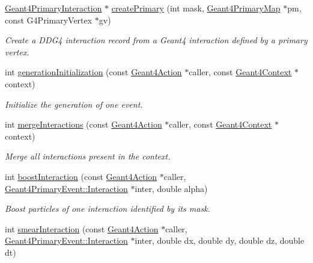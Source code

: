 \begin{DoxyCompactItemize}
\hyperlink{class_d_d4hep_1_1_simulation_1_1_geant4_primary_interaction}{Geant4\+Primary\+Interaction} $\ast$ \hyperlink{namespace_d_d4hep_1_1_simulation_a36acd8dbd545f60bf3b6c7f06209898e}{create\+Primary} (int mask, \hyperlink{class_d_d4hep_1_1_simulation_1_1_geant4_primary_map}{Geant4\+Primary\+Map} $\ast$pm, const G4\+Primary\+Vertex $\ast$gv)
\begin{DoxyCompactList}\small\item\em Create a D\+D\+G4 interaction record from a Geant4 interaction defined by a primary vertex. \end{DoxyCompactList}\item 
int \hyperlink{namespace_d_d4hep_1_1_simulation_aaf70bd3ee9651c20efdf16a10dfa8dc8}{generation\+Initialization} (const \hyperlink{class_d_d4hep_1_1_simulation_1_1_geant4_action}{Geant4\+Action} $\ast$caller, const \hyperlink{class_d_d4hep_1_1_simulation_1_1_geant4_context}{Geant4\+Context} $\ast$context)
\begin{DoxyCompactList}\small\item\em Initialize the generation of one event. \end{DoxyCompactList}\item 
int \hyperlink{namespace_d_d4hep_1_1_simulation_a443dcc90d4d35ae2cab73956bbd2a2d8}{merge\+Interactions} (const \hyperlink{class_d_d4hep_1_1_simulation_1_1_geant4_action}{Geant4\+Action} $\ast$caller, const \hyperlink{class_d_d4hep_1_1_simulation_1_1_geant4_context}{Geant4\+Context} $\ast$context)
\begin{DoxyCompactList}\small\item\em Merge all interactions present in the context. \end{DoxyCompactList}\item 
int \hyperlink{namespace_d_d4hep_1_1_simulation_a5af9f919753af128d90ae3bc13dc1c34}{boost\+Interaction} (const \hyperlink{class_d_d4hep_1_1_simulation_1_1_geant4_action}{Geant4\+Action} $\ast$caller, \hyperlink{class_d_d4hep_1_1_simulation_1_1_geant4_primary_event_afe42410b9331b521808a49120f402bd9}{Geant4\+Primary\+Event\+::\+Interaction} $\ast$inter, double alpha)
\begin{DoxyCompactList}\small\item\em Boost particles of one interaction identified by its mask. \end{DoxyCompactList}\item 
int \hyperlink{namespace_d_d4hep_1_1_simulation_a139e5502767fe9672b4d32c1e276aec3}{smear\+Interaction} (const \hyperlink{class_d_d4hep_1_1_simulation_1_1_geant4_action}{Geant4\+Action} $\ast$caller, \hyperlink{class_d_d4hep_1_1_simulation_1_1_geant4_primary_event_afe42410b9331b521808a49120f402bd9}{Geant4\+Primary\+Event\+::\+Interaction} $\ast$inter, double dx, double dy, double dz, double dt)

\end{DoxyCompactItemize}

